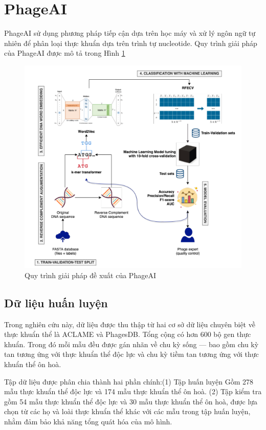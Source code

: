 \section{PhageAI}
PhageAI\cite{tynecki2020phageai} sử dụng phương pháp tiếp cận dựa trên học máy và xử lý ngôn ngữ tự nhiên để phân loại thực khuẩn dựa trên trình tự nucleotide. Quy trình giải pháp của PhageAI được mô tả trong Hình \ref{fig:phageai}
\begin{figure}[ht]
    \centering
    \includegraphics[width=0.8\linewidth]{figures/phageai.png}
    \caption{Quy trình giải pháp đề xuất của PhageAI}
    \label{fig:phageai}
\end{figure}

\subsection{Dữ liệu huấn luyện}
Trong nghiên cứu này, dữ liệu được thu thập từ hai cơ sở dữ liệu chuyên biệt về thực khuẩn thể là ACLAME và PhagesDB. Tổng cộng có hơn 600 bộ gen thực khuẩn. Trong đó mỗi mẫu đều được gán nhãn về chu kỳ sống — bao gồm chu kỳ tan tương ứng với thực khuẩn thể độc lực và chu kỳ tiềm tan tương ứng với thực khuẩn thể ôn hoà.

Tập dữ liệu được phân chia thành hai phần chính:(1) Tập huấn luyện Gồm 278 mẫu thực khuẩn thể độc lực và 174 mẫu thực khuẩn thể ôn hoà. (2) Tập kiểm tra gồm 54 mẫu thực khuẩn thể độc lực và 30 mẫu thực khuẩn thể ôn hoà, được lựa chọn từ các họ và loài thực khuẩn thể khác với các mẫu trong tập huấn luyện, nhằm đảm bảo khả năng tổng quát hóa của mô hình.


